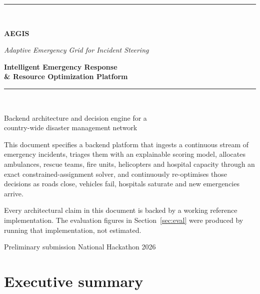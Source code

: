 \documentclass[11pt,a4paper]{article}
\begin{document}
\begin{titlepage}
\centering
\vspace*{2.2cm}
{\color{accent}\rule{\textwidth}{2pt}}\\[6mm]
{\Huge\bfseries AEGIS\par}
\vspace{3mm}
{\large\itshape Adaptive Emergency Grid for Incident Steering\par}
\vspace{7mm}
{\LARGE\bfseries Intelligent Emergency Response\\[2mm] \& Resource Optimization Platform\par}
\vspace{4mm}
{\color{accent}\rule{\textwidth}{2pt}}\\[10mm]

{\large Backend architecture and decision engine for a\\ country-wide disaster management network\par}
\vspace{14mm}

\begin{minipage}{0.86\textwidth}
\begin{keybox}
\small
This document specifies a backend platform that ingests a continuous stream of
emergency incidents, triages them with an explainable scoring model, allocates
ambulances, rescue teams, fire units, helicopters and hospital capacity through
an exact constrained-assignment solver, and continuously re-optimises those
decisions as roads close, vehicles fail, hospitals saturate and new emergencies
arrive.

Every architectural claim in this document is backed by a working reference
implementation. The evaluation figures in Section~\ref{sec:eval} were produced
by running that implementation, not estimated.
\end{keybox}
\end{minipage}

\vfill
{\small\color{muted}Preliminary submission \textbullet{} National Hackathon 2026\par}
\end{titlepage}

\tableofcontents
\newpage

\section{Executive summary}
\end{document}
